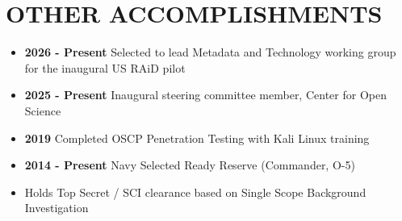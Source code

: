 \documentclass[10pt]{article}
\def\tightlist{}
\begin{document}
\section{OTHER ACCOMPLISHMENTS}\label{other-accomplishments}

\begin{itemize}
\tightlist
\item
  \textbf{2026 - Present} Selected to lead Metadata and Technology
  working group for the inaugural US RAiD pilot
\item
  \textbf{2025 - Present} Inaugural steering committee member, Center
  for Open Science
\item
  \textbf{2019} Completed OSCP Penetration Testing with Kali Linux
  training
\item
  \textbf{2014 - Present} Navy Selected Ready Reserve (Commander, O-5)
\item
  Holds Top Secret / SCI clearance based on Single Scope Background
  Investigation
\end{itemize}

\end{document}
